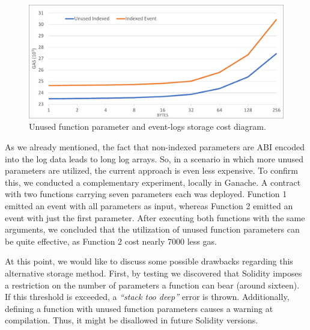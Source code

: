 \begin{figure}[htbp]
\centerline{\includegraphics[width=\textwidth]{figs/unused.pdf}}
\caption{Unused function parameter and event-logs storage cost diagram.}
\label{fig:unused}
\end{figure}

As we already mentioned, the fact that non-indexed parameters are ABI encoded into the log data leads to long log arrays. So, in a scenario in which more unused parameters are utilized, the current approach is even less expensive. To confirm this, we conducted a complementary experiment, locally in Ganache. A contract with two functions carrying seven parameters each was deployed. Function 1 emitted an event with all parameters as input, whereas Function 2 emitted an event with just the first parameter. After executing both functions with the same arguments, we concluded that the utilization of unused function parameters can be quite effective, as Function 2 cost nearly 7000 less gas.

At this point, we would like to discuss some possible drawbacks regarding this alternative storage method. First, by testing we discovered that Solidity imposes a restriction on the number of parameters a function can bear (around sixteen). If this threshold is exceeded, a \emph{``stack too deep''} error is thrown. Additionally, defining a function with unused function parameters causes a warning at compilation. Thus, it might be disallowed in future Solidity versions.

